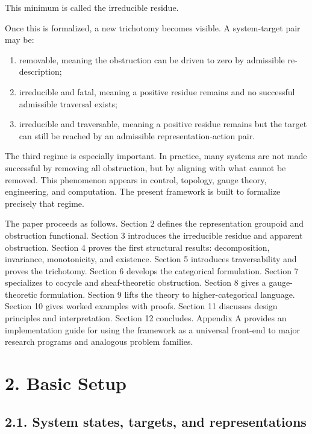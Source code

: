 \documentclass[
]{article}
\providecommand{\tightlist}{%
  \setlength{\itemsep}{0pt}\setlength{\parskip}{0pt}}
\begin{document}
This minimum is called the irreducible residue.

Once this is formalized, a new trichotomy becomes visible. A
system-target pair may be:

\begin{enumerate}
\def\labelenumi{\arabic{enumi}.}
\tightlist
\item
  removable, meaning the obstruction can be driven to zero by admissible
  re-description;
\item
  irreducible and fatal, meaning a positive residue remains and no
  successful admissible traversal exists;
\item
  irreducible and traversable, meaning a positive residue remains but
  the target can still be reached by an admissible representation-action
  pair.
\end{enumerate}

The third regime is especially important. In practice, many systems are
not made successful by removing all obstruction, but by aligning with
what cannot be removed. This phenomenon appears in control, topology,
gauge theory, engineering, and computation. The present framework is
built to formalize precisely that regime.

The paper proceeds as follows. Section 2 defines the representation
groupoid and obstruction functional. Section 3 introduces the
irreducible residue and apparent obstruction. Section 4 proves the first
structural results: decomposition, invariance, monotonicity, and
existence. Section 5 introduces traversability and proves the
trichotomy. Section 6 develops the categorical formulation. Section 7
specializes to cocycle and sheaf-theoretic obstruction. Section 8 gives
a gauge-theoretic formulation. Section 9 lifts the theory to
higher-categorical language. Section 10 gives worked examples with
proofs. Section 11 discusses design principles and interpretation.
Section 12 concludes. Appendix A provides an implementation guide for
using the framework as a universal front-end to major research programs
and analogous problem families.

\section{2. Basic Setup}\label{basic-setup}

\subsection{2.1. System states, targets, and
representations}\label{system-states-targets-and-representations}
\end{document}

